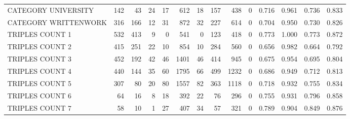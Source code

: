 \begin{tabular}{lrrrrrrrrrllll}
 CATEGORY UNIVERSITY      &             142 &            43 &              24 &              17 &             612 &   18 &  157 &  438 &    0 & 0.716 & 0.961 & 0.736 & 0.833 \\
 CATEGORY WRITTENWORK     &             316 &           166 &              12 &              31 &             872 &   32 &  227 &  614 &    0 & 0.704 & 0.950 & 0.730 & 0.826 \\
 TRIPLES COUNT 1          &             532 &           413 &               9 &               0 &             541 &    0 &  123 &  418 &    0 & 0.773 & 1.000 & 0.773 & 0.872 \\
 TRIPLES COUNT 2          &             415 &           251 &              22 &              10 &             854 &   10 &  284 &  560 &    0 & 0.656 & 0.982 & 0.664 & 0.792 \\
 TRIPLES COUNT 3          &             452 &           192 &              42 &              46 &            1401 &   46 &  414 &  945 &    0 & 0.675 & 0.954 & 0.695 & 0.804 \\
 TRIPLES COUNT 4          &             440 &           144 &              35 &              60 &            1795 &   66 &  499 & 1232 &    0 & 0.686 & 0.949 & 0.712 & 0.813 \\
 TRIPLES COUNT 5          &             307 &            80 &              20 &              80 &            1557 &   82 &  363 & 1118 &    0 & 0.718 & 0.932 & 0.755 & 0.834 \\
 TRIPLES COUNT 6          &              64 &            16 &               8 &              18 &             392 &   22 &   76 &  296 &    0 & 0.755 & 0.931 & 0.796 & 0.858 \\
 TRIPLES COUNT 7          &              58 &            10 &               1 &              27 &             407 &   34 &   57 &  321 &    0 & 0.789 & 0.904 & 0.849 & 0.876 \\
\hline
\end{tabular}
